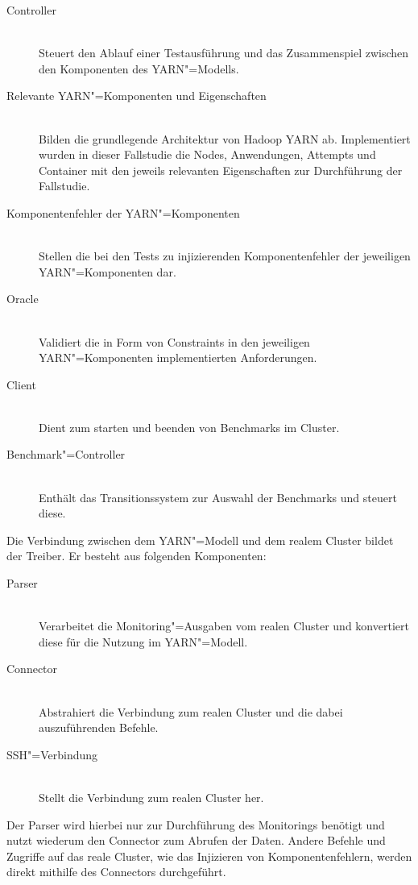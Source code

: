 \begin{description}
    \item [Controller] \hfill \\
        Steuert den Ablauf einer Testausführung und das Zusammenspiel zwischen den Komponenten des YARN"=Modells.
    \item [Relevante YARN"=Komponenten und Eigenschaften] \hfill \\
        Bilden die grundlegende Architektur von Hadoop YARN ab.
        Implementiert wurden in dieser Fallstudie die Nodes, Anwendungen, Attempts und Container mit den jeweils relevanten Eigenschaften zur Durchführung der Fallstudie.
    \item [Komponentenfehler der YARN"=Komponenten] \hfill \\
        Stellen die bei den Tests zu injizierenden Komponentenfehler der jeweiligen YARN"=Komponenten dar.
    \item [Oracle] \hfill \\
        Validiert die in Form von Constraints in den jeweiligen YARN"=Komponenten implementierten Anforderungen.
    \item [Client] \hfill \\
        Dient zum starten und beenden von Benchmarks im Cluster.
    \item [Benchmark"=Controller] \hfill \\
        Enthält das Transitionssystem zur Auswahl der Benchmarks und steuert diese.
\end{description}

Die Verbindung zwischen dem YARN"=Modell und dem realem Cluster bildet der Treiber.
Er besteht aus folgenden Komponenten:

\begin{description}
    \item [Parser] \hfill \\
        Verarbeitet die Monitoring"=Ausgaben vom realen Cluster und konvertiert diese für die Nutzung im YARN"=Modell.
    \item [Connector] \hfill \\
        Abstrahiert die Verbindung zum realen Cluster und die dabei auszuführenden Befehle.
    \item [SSH"=Verbindung]  \hfill \\
        Stellt die Verbindung zum realen Cluster her.
\end{description}

Der Parser wird hierbei nur zur Durchführung des Monitorings benötigt und nutzt wiederum den Connector zum Abrufen der Daten.
Andere Befehle und Zugriffe auf das reale Cluster, wie \zB das Injizieren von Komponentenfehlern, werden direkt mithilfe des Connectors durchgeführt.

